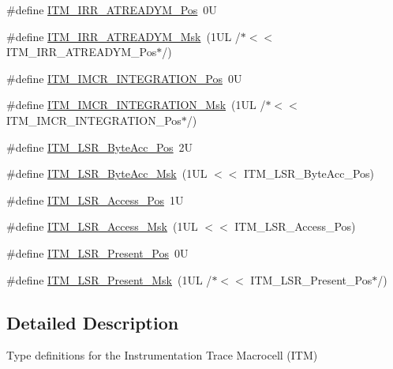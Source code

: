 \begin{DoxyCompactItemize}
\#define \mbox{\hyperlink{group__CMSIS__ITM_ga259edfd1d2e877a62e06d7a240df97f4}{I\+T\+M\+\_\+\+I\+R\+R\+\_\+\+A\+T\+R\+E\+A\+D\+Y\+M\+\_\+\+Pos}}~0U
\item 
\#define \mbox{\hyperlink{group__CMSIS__ITM_ga3dbc3e15f5bde2669cd8121a1fe419b9}{I\+T\+M\+\_\+\+I\+R\+R\+\_\+\+A\+T\+R\+E\+A\+D\+Y\+M\+\_\+\+Msk}}~(1\+U\+L /$\ast$$<$$<$ I\+T\+M\+\_\+\+I\+R\+R\+\_\+\+A\+T\+R\+E\+A\+D\+Y\+M\+\_\+\+Pos$\ast$/)
\item 
\#define \mbox{\hyperlink{group__CMSIS__ITM_ga08de02bf32caf48aaa29f7c68ff5d755}{I\+T\+M\+\_\+\+I\+M\+C\+R\+\_\+\+I\+N\+T\+E\+G\+R\+A\+T\+I\+O\+N\+\_\+\+Pos}}~0U
\item 
\#define \mbox{\hyperlink{group__CMSIS__ITM_ga8838bd3dd04c1a6be97cd946364a3fd2}{I\+T\+M\+\_\+\+I\+M\+C\+R\+\_\+\+I\+N\+T\+E\+G\+R\+A\+T\+I\+O\+N\+\_\+\+Msk}}~(1\+U\+L /$\ast$$<$$<$ I\+T\+M\+\_\+\+I\+M\+C\+R\+\_\+\+I\+N\+T\+E\+G\+R\+A\+T\+I\+O\+N\+\_\+\+Pos$\ast$/)
\item 
\#define \mbox{\hyperlink{group__CMSIS__ITM_gabfae3e570edc8759597311ed6dfb478e}{I\+T\+M\+\_\+\+L\+S\+R\+\_\+\+Byte\+Acc\+\_\+\+Pos}}~2U
\item 
\#define \mbox{\hyperlink{group__CMSIS__ITM_ga91f492b2891bb8b7eac5b58de7b220f4}{I\+T\+M\+\_\+\+L\+S\+R\+\_\+\+Byte\+Acc\+\_\+\+Msk}}~(1\+U\+L $<$$<$ I\+T\+M\+\_\+\+L\+S\+R\+\_\+\+Byte\+Acc\+\_\+\+Pos)
\item 
\#define \mbox{\hyperlink{group__CMSIS__ITM_ga144a49e12b83ad9809fdd2769094fdc0}{I\+T\+M\+\_\+\+L\+S\+R\+\_\+\+Access\+\_\+\+Pos}}~1U
\item 
\#define \mbox{\hyperlink{group__CMSIS__ITM_gac8ae69f11c0311da226c0c8ec40b3d37}{I\+T\+M\+\_\+\+L\+S\+R\+\_\+\+Access\+\_\+\+Msk}}~(1\+U\+L $<$$<$ I\+T\+M\+\_\+\+L\+S\+R\+\_\+\+Access\+\_\+\+Pos)
\item 
\#define \mbox{\hyperlink{group__CMSIS__ITM_gaf5740689cf14564d3f3fd91299b6c88d}{I\+T\+M\+\_\+\+L\+S\+R\+\_\+\+Present\+\_\+\+Pos}}~0U
\item 
\#define \mbox{\hyperlink{group__CMSIS__ITM_gaa5bc2a7f5f1d69ff819531f5508bb017}{I\+T\+M\+\_\+\+L\+S\+R\+\_\+\+Present\+\_\+\+Msk}}~(1\+U\+L /$\ast$$<$$<$ I\+T\+M\+\_\+\+L\+S\+R\+\_\+\+Present\+\_\+\+Pos$\ast$/)
\end{DoxyCompactItemize}


\subsection{Detailed Description}
Type definitions for the Instrumentation Trace Macrocell (I\+TM) 



